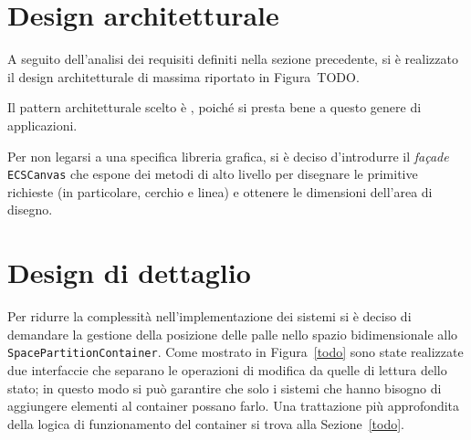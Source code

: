 \section{Design architetturale}\label{sec:demo-design-architetturale}
A seguito dell'analisi dei requisiti definiti nella sezione precedente, si è realizzato il design architetturale di
massima riportato in Figura~TODO\@.

Il pattern architetturale scelto è \ECS, poiché si presta bene a questo genere di applicazioni.

Per non legarsi a una specifica libreria grafica, si è deciso d'introdurre il \textit{façade} \texttt{ECSCanvas}
che espone dei metodi di alto livello per disegnare le primitive richieste (in particolare, cerchio e linea) e ottenere
le dimensioni dell'area di disegno.

\section{Design di dettaglio}\label{sec:demo-design-di-dettaglio}
Per ridurre la complessità nell'implementazione dei sistemi si è deciso di demandare la gestione della posizione delle
palle nello spazio bidimensionale allo \texttt{SpacePartitionContainer}.
Come mostrato in Figura~\ref{todo} sono state realizzate due interfaccie che separano le operazioni di modifica da
quelle di lettura dello stato;
in questo modo si può garantire che solo i sistemi che hanno bisogno di aggiungere elementi al container possano farlo.
Una trattazione più approfondita della logica di funzionamento del container si trova alla Sezione~\ref{todo}.

